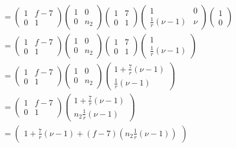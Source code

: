 \begin{loesung}
\begin{align*}
\\
&=
\begin{pmatrix}1&f-7\\0&1\end{pmatrix}
\begin{pmatrix}1&0\\0&n_2\end{pmatrix}
\begin{pmatrix}1&7\\0&1\end{pmatrix}
\begin{pmatrix}1&0\\\frac1r(\nu-1)&\nu\end{pmatrix}
\begin{pmatrix}1\\0\end{pmatrix}
\\
&=
\begin{pmatrix}1&f-7\\0&1\end{pmatrix}
\begin{pmatrix}1&0\\0&n_2\end{pmatrix}
\begin{pmatrix}1&7\\0&1\end{pmatrix}
\begin{pmatrix}1\\\frac1r(\nu-1)\end{pmatrix}
\\
&=
\begin{pmatrix}1&f-7\\0&1\end{pmatrix}
\begin{pmatrix}1&0\\0&n_2\end{pmatrix}
\begin{pmatrix}1+\frac7r(\nu-1)\\\frac1r(\nu-1)\end{pmatrix}
\\
&=
\begin{pmatrix}1&f-7\\0&1\end{pmatrix}
\begin{pmatrix}1+\frac7r(\nu-1)\\n_2\frac1r(\nu-1)\end{pmatrix}
\\
&=
\begin{pmatrix}
1+\frac7r(\nu-1)
+
(f-7)(n_2\frac1r(\nu-1))

\end{pmatrix}
\end{align*}
\end{loesung}
